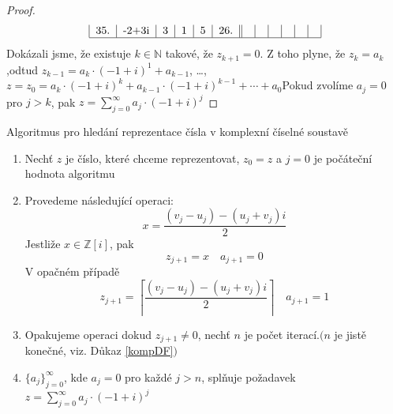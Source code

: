 \documentclass[czech,bachelor,dept470,male]{diploma}
\begin{document}
\begin{proof}
\begin{equation*}
\begin{tabular}{|c|c|c|c|c|c||c|c|c|c|c|c|}
			35. & -2+3i & 3         & 1         & 5         & 26.  &     &       &           &           &           &      \\\hline
		\end{tabular}
	\end{equation*}\newpage
	Dokázali jsme, že existuje $k \in \mathbb{N}$ takové, že $z_{k+1} = 0$. Z toho plyne, že $z_k = a_k$,\newline odtud $z_{k-1} = a_k\cdot(-1+i)^1 + a_{k-1}$, \dots, $z = z_0 = a_k\cdot(-1+i)^k + a_{k-1}\cdot(-1+i)^{k-1} + \cdots + a_0$\newline Pokud zvolíme $a_j = 0$ pro $j > k$, pak $z=\sum_{j=0}^{\infty}a_j\cdot(-1+i)^j$
\end{proof}
\begin{remark} Algoritmus pro hledání reprezentace čísla v komplexní číselné soustavě
	\begin{enumerate}
		\item Nechť $z$ je číslo, které chceme reprezentovat, $z_0 = z$ a $j=0$ je počáteční hodnota algoritmu
		\item Provedeme následující operaci:\newline
		      $$x = \frac{(v_j-u_j)-(u_j+v_j)i}{2}$$
		      Jestliže $x \in \mathbb{Z}[i]$, pak $$z_{j+1} = x \quad a_{j+1}=0$$
		      V opačném případě $$z_{j+1} = \left\lceil\frac{(v_j-u_j)-(u_j+v_j)i}{2}\right\rceil\quad a_{j+1}=1$$
		\item Opakujeme operaci dokud $z_{j+1}\ne0$, nechť $n$ je počet iterací.\newline $(n$ je jistě konečné, viz. Důkaz \ref{kompDF}$)$
		\item $\{a_j\}_{j=0}^{\infty}$, kde $a_j=0$ pro každé $j>n$, splňuje požadavek $z=
			      \sum_{j=0}^{\infty}a_j\cdot(-1+i)^j$
	\end{enumerate}
\end{remark}
\end{document}
